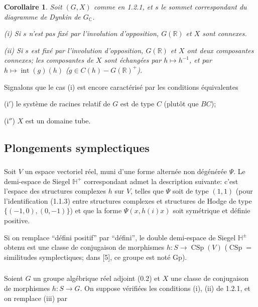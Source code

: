 \documentclass[12pt,a4paper]{article}
\theoremstyle{plain}
\newtheorem{corollary}[theorem]{Corollaire}
\theoremstyle{definition}
\theoremstyle{remark}
\DeclareMathOperator{\CSp}{CSp}
\DeclareMathOperator{\Int}{int}
\newcommand{\RR}{\mathbb{R}}
\newcommand{\CC}{\mathbb{C}}
\newcommand{\HH}{\mathbb{H}}
\begin{document}
\begin{corollary}
Soit $(G,X)$ comme en \textup{1.2.1}, et $s$ le sommet correspondant du diagramme de Dynkin de $G_{\CC}$.

\textup{(i)} Si $s$ n'est pas fix\'e par l'involution d'opposition, $G(\RR)$ et $X$ sont connexes.

\textup{(ii)} Si $s$ est fix\'e par l'involution d'opposition, $G(\RR)$ et $X$ ont deux composantes connexes; les composantes de $X$ sont \'echang\'ees par $h \mapsto h^{-1}$, et par $h \mapsto \Int(g)(h)$ ($g \in C(h) - G(\RR)^+$).
\end{corollary}

Signalons que le cas (i) est encore caract\'eris\'e par les conditions \'equivalentes

(i$'$) le syst\`eme de racines relatif de $G$ est de type $C$ (plut\^ot que $BC$);

(i$''$) $X$ est un domaine tube.

\subsection{Plongements symplectiques}

\subsubsection{}

Soit $V$ un espace vectoriel r\'eel, muni d'une forme altern\'ee non d\'eg\'en\'er\'ee $\Psi$. Le demi-espace de Siegel $\HH^+$ correspondant admet la description suivante: c'est l'espace des structures complexes $h$ sur $V$, telles que $\Psi$ soit de type $(1,1)$ (pour l'identification (1.1.3) entre structures complexes et structures de Hodge de type $\{(-1,0),(0,-1)\}$) et que la forme $\Psi(x,h(i)x)$ soit sym\'etrique et d\'efinie positive.

Si on remplace ``d\'efini positif'' par ``d\'efini'', le double demi-espace de Siegel $\HH^{\pm}$ obtenu est une classe de conjugaison de morphismes $h:S \to \CSp(V)$ ($\CSp =$ similitudes symplectiques; dans [5], ce groupe est not\'e $\text{Gp}$).

\subsubsection{}

Soient $G$ un groupe alg\'ebrique r\'eel adjoint (0.2) et $X$ une classe de conjugaison de morphismes $h:S \to G$. On suppose v\'erifi\'ees les conditions (i), (ii) de 1.2.1, et on remplace (iii) par
\end{document}
